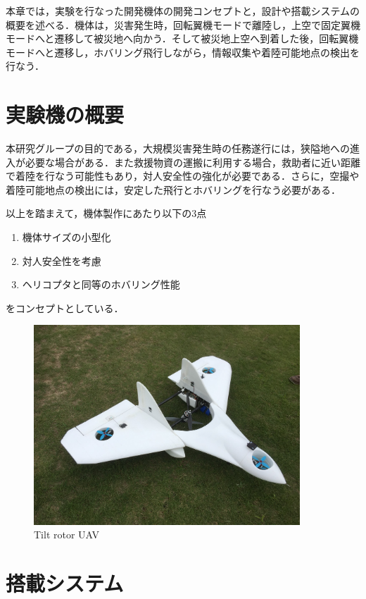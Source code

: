 本章では，実験を行なった開発機体の開発コンセプトと，設計や搭載システムの概要を述べる．機体は，災害発生時，回転翼機モードで離陸し，上空で固定翼機モードへと遷移して被災地へ向かう．そして被災地上空へ到着した後，回転翼機モードへと遷移し，ホバリング飛行しながら，情報収集や着陸可能地点の検出を行なう．

\section{実験機の概要}
本研究グループの目的である，大規模災害発生時の任務遂行には，狭隘地への進入が必要な場合がある．また救援物資の運搬に利用する場合，救助者に近い距離で着陸を行なう可能性もあり，対人安全性の強化が必要である．さらに，空撮や着陸可能地点の検出には，安定した飛行とホバリングを行なう必要がある．

以上を踏まえて，機体製作にあたり以下の3点
	\begin{enumerate}
	\item 機体サイズの小型化
	\item 対人安全性を考慮
	\item ヘリコプタと同等のホバリング性能
	\end{enumerate}
をコンセプトとしている．

	\begin{figure}[h]
	\begin{center}
	\includegraphics[clip,width=10.0cm]{vtol23K_2.JPG}
	\caption{Tilt rotor UAV}
	\label{fig:vtol23k}
	\end{center}
	\end{figure}

\section{搭載システム}
